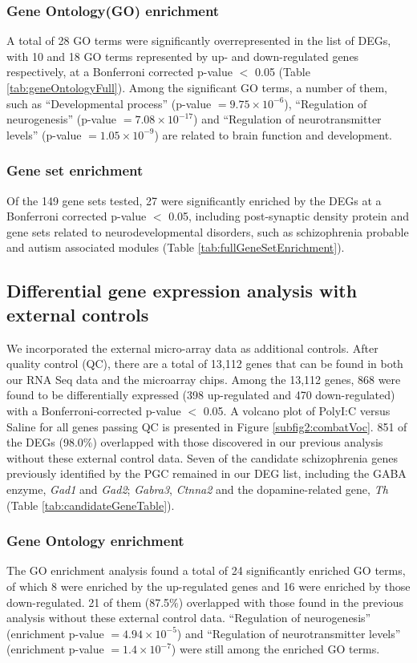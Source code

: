 \subsubsection{Gene Ontology(GO) enrichment}
A total of 28 GO terms were significantly overrepresented in the list of DEGs, with 10 and 18 GO terms represented by up- and down-regulated genes respectively, at a Bonferroni corrected p-value $<$ 0.05 (Table \ref{tab:geneOntologyFull}). 
Among the significant GO terms, a number of them, such as ``Developmental process'' (p-value $= 9.75\times 10^{-6}$), ``Regulation of neurogenesis'' (p-value $= 7.08\times 10^{-17}$) and ``Regulation of neurotransmitter levels'' (p-value $= 1.05\times 10^{-9}$) are related to brain function and development.

\subsubsection{Gene set enrichment}
Of the 149 gene sets tested, 27 were significantly enriched by the DEGs at a Bonferroni corrected p-value $<$ 0.05, including post-synaptic density protein and gene sets related to neurodevelopmental disorders, such as schizophrenia probable and autism associated modules (Table \ref{tab:fullGeneSetEnrichment}).

\subsection{Differential gene expression analysis with external controls}
We incorporated the external micro-array data as additional controls.
After quality control (QC), there are a total of 13,112 genes that can be found in both our RNA Seq data and the microarray chips.
Among the 13,112 genes, 868 were found to be differentially expressed (398 up-regulated and 470 down-regulated) with a Bonferroni-corrected p-value $<$ 0.05.
A volcano plot of PolyI:C versus Saline for all genes passing QC is presented in Figure \ref{subfig2:combatVoc}. 851 of the DEGs (98.0$\%$) overlapped with those discovered in our previous analysis without these external control data. 
Seven of the candidate schizophrenia genes previously identified by the PGC remained in our DEG list, including the GABA enzyme, \textit{Gad1} and \textit{Gad2}; \textit{Gabra3}, \textit{Ctnna2} and the dopamine-related gene, \textit{Th} (Table \ref{tab:candidateGeneTable}). 

\subsubsection{Gene Ontology enrichment}
The GO enrichment analysis found a total of 24 significantly enriched GO terms, of which 8 were enriched by the up-regulated genes and 16 were enriched by those down-regulated.
21 of them (87.5$\%$) overlapped with those found in the previous analysis without these external control data. ``Regulation of neurogenesis'' (enrichment p-value $= 4.94\times10^{-5}$) and ``Regulation of neurotransmitter levels'' (enrichment p-value $= 1.4\times10^{-7}$) were still among the enriched GO terms. 
